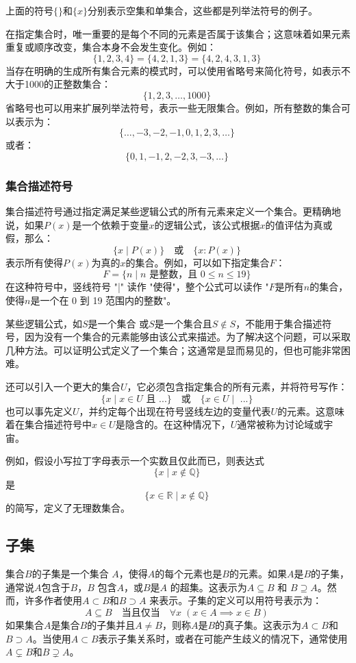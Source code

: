 上面的符号\( \{\} \)和\( \{x\} \)分别表示空集和单集合，这些都是列举法符号的例子。

在指定集合时，唯一重要的是每个不同的元素是否属于该集合；这意味着如果元素重复或顺序改变，集合本身不会发生变化。例如：
\[
\{1, 2, 3, 4\} = \{4, 2, 1, 3\} = \{4, 2, 4, 3, 1, 3\}~
\]
当存在明确的生成所有集合元素的模式时，可以使用省略号来简化符号，如表示不大于1000的正整数集合：
\[
\{1, 2, 3, \ldots, 1000\}~
\]
省略号也可以用来扩展列举法符号，表示一些无限集合。例如，所有整数的集合可以表示为：
\[
\{\ldots, -3, -2, -1, 0, 1, 2, 3, \ldots\}~
\]
或者：
\[
\{0, 1, -1, 2, -2, 3, -3, \ldots\}~
\]
\subsubsection{集合描述符号}
集合描述符号通过指定满足某些逻辑公式的所有元素来定义一个集合。更精确地说，如果\( P(x) \)是一个依赖于变量\( x \)的逻辑公式，该公式根据\( x \)的值评估为真或假，那么：
\[
\{x \mid P(x)\} \quad \text{或} \quad \{x : P(x)\}~
\]
表示所有使得\( P(x) \)为真的\( x \)的集合。例如，可以如下指定集合\( F \)：
\[
F = \{n \mid n \text{ 是整数，且 } 0 \leq n \leq 19\}~
\]
在这种符号中，竖线符号 "|" 读作 "使得"，整个公式可以读作 "\(F\)是所有\( n \)的集合，使得\( n \)是一个在 0 到 19 范围内的整数"。

某些逻辑公式，如\( S \)是一个集合 或\( S \)是一个集合且\( S \notin S \)，不能用于集合描述符号，因为没有一个集合的元素能够由该公式来描述。为了解决这个问题，可以采取几种方法。可以证明公式定义了一个集合；这通常是显而易见的，但也可能非常困难。

还可以引入一个更大的集合\( U \)，它必须包含指定集合的所有元素，并将符号写作：
\[
\{x \mid x \in U \text{ 且 ...}\} \quad \text{或} \quad \{x \in U \mid \text{ ...}\}~
\]
也可以事先定义\( U \)，并约定每个出现在符号竖线左边的变量代表\( U \)的元素。这意味着在集合描述符号中\( x \in U \)是隐含的。在这种情况下，\( U \)通常被称为讨论域或宇宙。

例如，假设小写拉丁字母表示一个实数且仅此而已，则表达式
\[
\{x \mid x \notin \mathbb{Q}\}~
\]
是
\[
\{x \in \mathbb{R} \mid x \notin \mathbb{Q}\}~
\]
的简写，定义了无理数集合。
\subsection{子集}
集合\( B \)的子集是一个集合 \( A \)，使得\( A \)的每个元素也是\( B \)的元素。如果\( A \)是\( B \)的子集，通常说\( A \)包含于\( B \)，\( B \) 包含\( A \)，或\( B \)是\( A \) 的超集。这表示为\( A \subseteq B \) 和 \( B \supseteq A \)。然而，许多作者使用\( A \subset B \)和\( B \supset A \) 来表示。子集的定义可以用符号表示为：
\[
A \subseteq B \quad \text{当且仅当} \quad \forall x \; (x \in A \implies x \in B)~
\]
如果集合\( A \)是集合\( B \)的子集并且\( A \neq B \)，则称\( A \)是\( B \)的真子集。这表示为\( A \subset B \)和\( B \supset A \)。当使用\( A \subset B \)表示子集关系时，或者在可能产生歧义的情况下，通常使用\( A \subsetneq B \)和\( B \supsetneq A \)。

